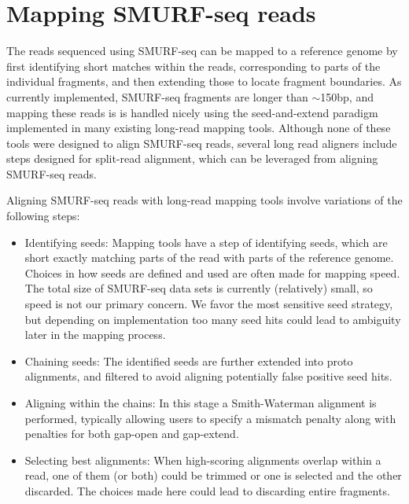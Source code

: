 \section{Mapping SMURF-seq reads}
The reads sequenced using SMURF-seq can be mapped to a reference genome
by first identifying short matches within the reads, corresponding to
parts of the individual fragments, and then extending those to locate
fragment boundaries.
%
As currently implemented, SMURF-seq fragments are longer than
$\sim$150bp, and mapping these reads is is handled nicely using the
seed-and-extend paradigm implemented in many existing long-read mapping
tools. Although none of these tools were designed to align SMURF-seq
reads, several long read aligners include steps designed for split-read
alignment, which can be leveraged from aligning SMURF-seq reads.

Aligning SMURF-seq reads with long-read mapping tools involve variations
of the following steps:
\begin{itemize}
\item Identifying seeds: Mapping tools have a step of identifying seeds,
  which are short exactly matching parts of the read with parts of the
  reference genome. Choices in how seeds are defined and used are often
  made for mapping speed. The total size of SMURF-seq data sets is
  currently (relatively) small, so speed is not our primary concern. We
  favor the most sensitive seed strategy, but depending on implementation
  too many seed hits could lead to ambiguity later in the mapping process.
\item Chaining seeds: The identified seeds are further extended into
  proto alignments, and filtered to avoid aligning potentially false
  positive seed hits.
\item Aligning within the chains: In this stage a Smith-Waterman
  alignment is performed, typically allowing users to specify a mismatch
  penalty along with penalties for both gap-open and gap-extend.
\item Selecting best alignments: When high-scoring alignments overlap
  within a read, one of them (or both) could be trimmed or one is selected
  and the other discarded. The choices made here could lead to discarding
  entire fragments.
\end{itemize}

